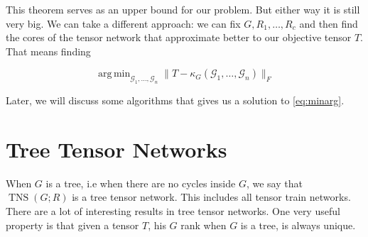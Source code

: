 \documentclass[11pt,a4paper,openright,oneside]{book}
\numberwithin{equation}{section}
\newcommand{\refeq}[1]{\cref{#1}}
\DeclareMathOperator{\TNS}{TNS}
\DeclareMathOperator*{\argmin}{arg\,min}
\begin{document}
This theorem serves as an upper bound for our problem. But either way it is still very big. We can take a different approach:
we can fix $G, R_1, \dots, R_c$ and then find the cores of the tensor network that approximate better to our
objective tensor $T$. That means finding

\begin{equation}
\argmin_{\mathcal{G}_1, \dots, \mathcal{G}_n} \|T - \kappa_G (\mathcal{G}_1, \dots, \mathcal{G}_n) \|_F
\label{eq:minarg}
\end{equation}

Later, we will discuss some algorithms that gives us a solution to \refeq{eq:minarg}. 
\section{Tree Tensor Networks}

When $G$ is a tree, i.e when there are no cycles inside $G$, we say that $\TNS(G; R)$ is a tree tensor network.
This includes all tensor train networks. There are a lot of interesting results in tree tensor networks. One
very useful property is that given a tensor $T$, his $G$ rank when $G$ is a tree, is always unique.
\end{document}
